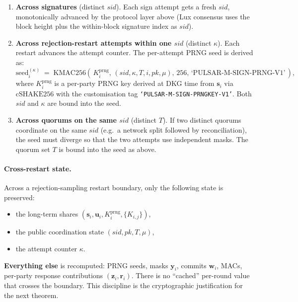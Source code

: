 \documentclass[11pt,a4paper]{article}
\theoremstyle{definition}
\theoremstyle{remark}
\newcommand{\cSHAKE}{\mathrm{cSHAKE256}}
\newcommand{\KMAC}{\mathrm{KMAC256}}
\begin{document}
\begin{enumerate}[leftmargin=*, itemsep=0pt]
\item \textbf{Across signatures} (distinct $\mathit{sid}$). Each
sign attempt gets a fresh $\mathit{sid}$, monotonically advanced
by the protocol layer above (Lux consensus uses the block height
plus the within-block signature index as $\mathit{sid}$).
\item \textbf{Across rejection-restart attempts within one
$\mathit{sid}$} (distinct $\kappa$). Each restart advances the
attempt counter. The per-attempt PRNG seed is derived as:
\[
\text{seed}_i^{(\kappa)} \;=\;
\KMAC(\,K_i^{\mathrm{prng}},\,
(\mathit{sid}, \kappa, T, i, \mathit{pk}, \mu),\,
256,\,
\text{`PULSAR-M-SIGN-PRNG-V1'}\,),
\]
where $K_i^{\mathrm{prng}}$ is a per-party PRNG key derived at DKG
time from $\mathbf{s}_i$ via $\cSHAKE$ with the customisation tag
\texttt{`PULSAR-M-SIGN-PRNGKEY-V1'}. Both $\mathit{sid}$ and $\kappa$
are bound into the seed.
\item \textbf{Across quorums on the same $\mathit{sid}$} (distinct
$T$). If two distinct quorums coordinate on the same $\mathit{sid}$
(e.g.\ a network split followed by reconciliation), the seed must
diverge so that the two attempts use independent masks. The
quorum set $T$ is bound into the seed as above.
\end{enumerate}

\paragraph{Cross-restart state.}
Across a rejection-sampling restart boundary, only the following
state is preserved:
\begin{itemize}[leftmargin=*, itemsep=0pt]
\item the long-term shares $(\mathbf{s}_i, \mathbf{u}_i, K_i^{\mathrm{prng}}, \{K_{i,j}\})$,
\item the public coordination state $(\mathit{sid}, \mathit{pk}, T, \mu)$,
\item the attempt counter $\kappa$.
\end{itemize}
\textbf{Everything else} is recomputed: PRNG seeds, masks
$\mathbf{y}_i$, commits $\mathbf{w}_i$, MACs, per-party response
contributions $(\mathbf{z}_i, \mathbf{r}_i)$. There is no
``cached'' per-round value that crosses the boundary. This
discipline is the cryptographic justification for the next theorem.
\end{document}
